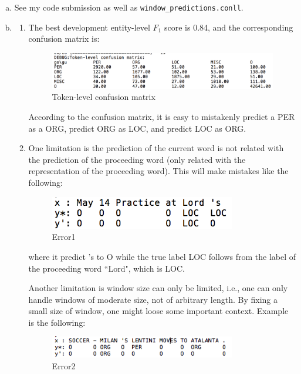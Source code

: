 \documentclass[11pt, oneside]{article}      %
\newcommand{\hasPageBreak}{\newpage}
\begin{document}
\begin{enumerate}   [(a)]
\item
See my code submission as well as \texttt{window\_predictions.conll}.



\hasPageBreak
\item
\begin{enumerate}   [i]
\item 
The best development entity-level $F_1$ score is 0.84, and the corresponding confusion matrix is:

\begin{figure}[htbp] %
   \centering
   \includegraphics[width=5.2in]{Q1_confusion.png} 
   \caption{Token-level confusion matrix}
   \label{Fig:Q1_confusion}
\end{figure}

According to the confusion matrix, it is easy to mistakenly predict a PER as a ORG, predict ORG as LOC, and predict LOC as ORG.


\item
One limitation is the prediction of the current word is not related with the prediction of the proceeding word (only related with the representation of the proceeding word). This will make mistakes like the following:

\begin{figure}[htbp] %
   \centering
   \includegraphics[width=3.2in]{Q1_error1.png} 
   \caption{Error1}
   \label{Fig:Q1_error1}
\end{figure}

where it predict 's to O while the true label LOC follows from the label of the proceeding word ``Lord", which is LOC.


Another limitation is window size can only be limited, i.e., one can only handle windows of moderate size, not of arbitrary length. By fixing a small size of window, one might loose some important context. Example is the following:
\begin{figure}[htbp] %
   \centering
   \includegraphics[width=3.2in]{Q1_error2.png} 
   \caption{Error2}
   \label{Fig:Q1_error2}
\end{figure}


\end{enumerate}
\end{enumerate}
\end{document}
